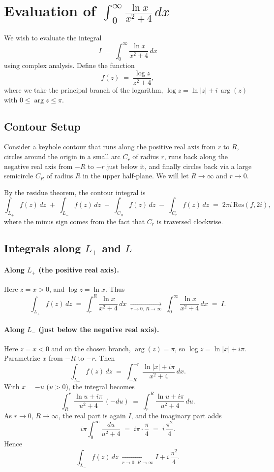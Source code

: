 \documentclass[12pt]{article}
\title{}
\author{Jerich Lee}
\date{\today}
\theoremstyle{definition} %
\theoremstyle{plain} %
\begin{document}
\section*{Evaluation of $\displaystyle \int_{0}^{\infty} \frac{\ln x}{x^2 + 4}\,dx$}

We wish to evaluate the integral
\[
I \;=\; \int_{0}^{\infty} \frac{\ln x}{x^2 + 4}\,dx
\]
using complex analysis. Define the function
\[
f(z) \;=\; \frac{\log z}{z^2 + 4},
\]
where we take the principal branch of the logarithm, $\log z = \ln|z| + i\,\arg(z)$ with $0 \le \arg z \le \pi$.

\subsection*{Contour Setup}

Consider a keyhole contour that runs along the positive real axis from $r$ to $R$, circles around the origin in a small arc $C_r$ of radius $r$, runs back along the negative real axis from $-R$ to $-r$ just below it, and finally circles back via a large semicircle $C_R$ of radius $R$ in the upper half-plane. We will let $R \to \infty$ and $r \to 0$.

By the residue theorem, the contour integral is
\[
\int_{L_{+}} f(z)\,dz 
\;+\;\int_{L_{-}} f(z)\,dz 
\;+\;\int_{C_{R}} f(z)\,dz 
\;-\;\int_{C_{r}} f(z)\,dz
\;=\; 2\pi i \,\mathrm{Res}(f,2i),
\]
where the minus sign comes from the fact that $C_r$ is traversed clockwise.

\subsection*{Integrals along $L_{+}$ and $L_{-}$}

\paragraph{Along $L_{+}$ (the positive real axis).}
Here $z=x>0$, and $\log z = \ln x$. Thus
\[
\int_{L_{+}} f(z)\,dz 
\;=\;\int_{r}^{R} \frac{\ln x}{x^2 + 4}\,dx
\;\xrightarrow[r \to 0,\, R \to \infty]{}\; \int_{0}^{\infty} \frac{\ln x}{x^2 + 4}\,dx
\;=\; I.
\]

\paragraph{Along $L_{-}$ (just below the negative real axis).}
Here $z=x<0$ and on the chosen branch, $\arg(z) = \pi$, so $\log z = \ln|x| + i\pi$. Parametrize $x$ from $-R$ to $-r$. Then
\[
\int_{L_{-}} f(z)\,dz 
\;=\;\int_{-R}^{-r} \frac{\ln|x| + i\pi}{x^2 + 4}\,dx.
\]
With $x = -u$ ($u>0$), the integral becomes
\[
\int_{R}^{r} \frac{\ln u + i\pi}{u^2 + 4}\,(-du)
\;=\;\int_{r}^{R} \frac{\ln u + i\pi}{u^2 + 4}\,du.
\]
As $r \to 0$, $R \to \infty$, the real part is again $I$, and the imaginary part adds
\[
i\pi \int_{0}^{\infty} \frac{du}{u^2 + 4}
\;=\; i\pi \cdot \frac{\pi}{4}
\;=\; i\,\frac{\pi^2}{4}.
\]
Hence
\[
\int_{L_{-}} f(z)\,dz 
\;\xrightarrow[r \to 0,\, R \to \infty]{}
I + i\,\frac{\pi^2}{4}.
\]
\end{document}
